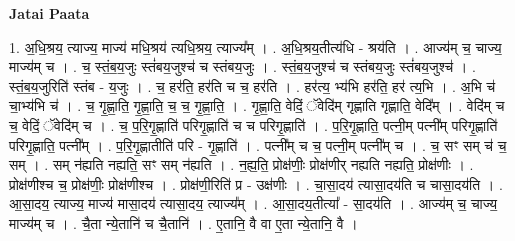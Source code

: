 \documentclass[17pt]{extarticle}
\begin{document}
\textbf{Jatai Paata} \newline

1. अ॒धि॒श्रय॒ त्याज्य॒ माज्य॑ मधि॒श्रय॑ त्यधि॒श्रय॒ त्याज्य᳚म् । . अ॒धि॒श्रय॒तीत्य॑धि - श्रय॑ति । . आज्य॑म् च॒ चाज्य॒ माज्य॑म् च । . च॒ स्तं॒ब॒य॒जुः स्तं॑बय॒जुश्च॑ च स्तंबय॒जुः । . स्तं॒ब॒य॒जुश्च॑ च स्तंबय॒जुः स्तं॑बय॒जुश्च॑ । . स्तं॒ब॒य॒जुरिति॑ स्तंब - य॒जुः । . च॒ हर॑ति॒ हर॑ति च च॒ हर॑ति । . हर॑त्य॒ भ्य॑भि हर॑ति॒ हर॑ त्य॒भि । . अ॒भि च॑ चा॒भ्य॑भि च॑ । . च॒ गृ॒ह्णा॒ति॒ गृ॒ह्णा॒ति॒ च॒ च॒ गृ॒ह्णा॒ति॒ । . गृ॒ह्णा॒ति॒ वेदिं॒ ॅवेदि॑म् गृह्णाति गृह्णाति॒ वेदि᳚म् । . वेदि॑म् च च॒ वेदिं॒ ॅवेदि॑म् च । . च॒ प॒रि॒गृ॒ह्णाति॑ परिगृ॒ह्णाति॑ च च परिगृ॒ह्णाति॑ । . प॒रि॒गृ॒ह्णाति॒ पत्नी॒म् पत्नी᳚म् परिगृ॒ह्णाति॑ परिगृ॒ह्णाति॒ पत्नी᳚म् । . प॒रि॒गृ॒ह्णातीति॑ परि - गृ॒ह्णाति॑ । . पत्नी᳚म् च च॒ पत्नी॒म् पत्नी᳚म् च । . च॒ सꣳ सम् च॑ च॒ सम् । . सम् न॑ह्यति नह्यति॒ सꣳ सम् न॑ह्यति । . न॒ह्य॒ति॒ प्रोक्ष॑णीः॒ प्रोक्ष॑णीर् नह्यति नह्यति॒ प्रोक्ष॑णीः । . प्रोक्ष॑णीश्च च॒ प्रोक्ष॑णीः॒ प्रोक्ष॑णीश्च । . प्रोक्ष॑णी॒रिति॑ प्र - उक्ष॑णीः । . चा॒सा॒दय॑ त्यासा॒दय॑ति च चासा॒दय॑ति । . आ॒सा॒दय॒ त्याज्य॒ माज्य॑ मासा॒दय॑ त्यासा॒दय॒ त्याज्य᳚म् । . आ॒सा॒दय॒तीत्या᳚ - सा॒दय॑ति । . आज्य॑म् च॒ चाज्य॒ माज्य॑म् च । . चै॒ता न्ये॒तानि॑ च चै॒तानि॑ । . ए॒तानि॒ वै वा ए॒ता न्ये॒तानि॒ वै । \newline
\end{document}
